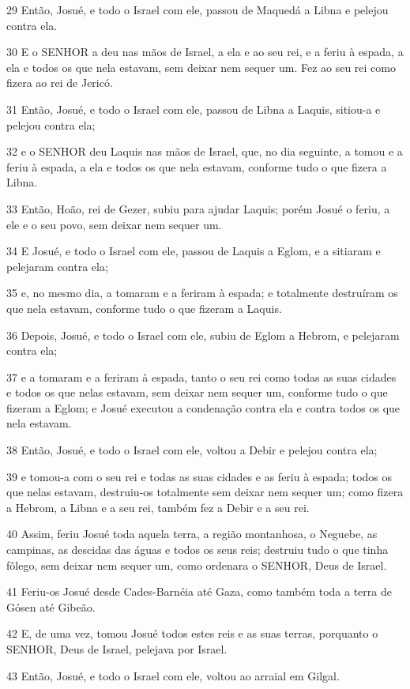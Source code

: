 \par 29 Então, Josué, e todo o Israel com ele, passou de Maquedá a Libna e pelejou contra ela.
\par 30 E o SENHOR a deu nas mãos de Israel, a ela e ao seu rei, e a feriu à espada, a ela e todos os que nela estavam, sem deixar nem sequer um. Fez ao seu rei como fizera ao rei de Jericó.
\par 31 Então, Josué, e todo o Israel com ele, passou de Libna a Laquis, sitiou-a e pelejou contra ela;
\par 32 e o SENHOR deu Laquis nas mãos de Israel, que, no dia seguinte, a tomou e a feriu à espada, a ela e todos os que nela estavam, conforme tudo o que fizera a Libna.
\par 33 Então, Hoão, rei de Gezer, subiu para ajudar Laquis; porém Josué o feriu, a ele e o seu povo, sem deixar nem sequer um.
\par 34 E Josué, e todo o Israel com ele, passou de Laquis a Eglom, e a sitiaram e pelejaram contra ela;
\par 35 e, no mesmo dia, a tomaram e a feriram à espada; e totalmente destruíram os que nela estavam, conforme tudo o que fizeram a Laquis.
\par 36 Depois, Josué, e todo o Israel com ele, subiu de Eglom a Hebrom, e pelejaram contra ela;
\par 37 e a tomaram e a feriram à espada, tanto o seu rei como todas as suas cidades e todos os que nelas estavam, sem deixar nem sequer um, conforme tudo o que fizeram a Eglom; e Josué executou a condenação contra ela e contra todos os que nela estavam.
\par 38 Então, Josué, e todo o Israel com ele, voltou a Debir e pelejou contra ela;
\par 39 e tomou-a com o seu rei e todas as suas cidades e as feriu à espada; todos os que nelas estavam, destruiu-os totalmente sem deixar nem sequer um; como fizera a Hebrom, a Libna e a seu rei, também fez a Debir e a seu rei.
\par 40 Assim, feriu Josué toda aquela terra, a região montanhosa, o Neguebe, as campinas, as descidas das águas e todos os seus reis; destruiu tudo o que tinha fôlego, sem deixar nem sequer um, como ordenara o SENHOR, Deus de Israel.
\par 41 Feriu-os Josué desde Cades-Barnéia até Gaza, como também toda a terra de Gósen até Gibeão.
\par 42 E, de uma vez, tomou Josué todos estes reis e as suas terras, porquanto o SENHOR, Deus de Israel, pelejava por Israel.
\par 43 Então, Josué, e todo o Israel com ele, voltou ao arraial em Gilgal.

